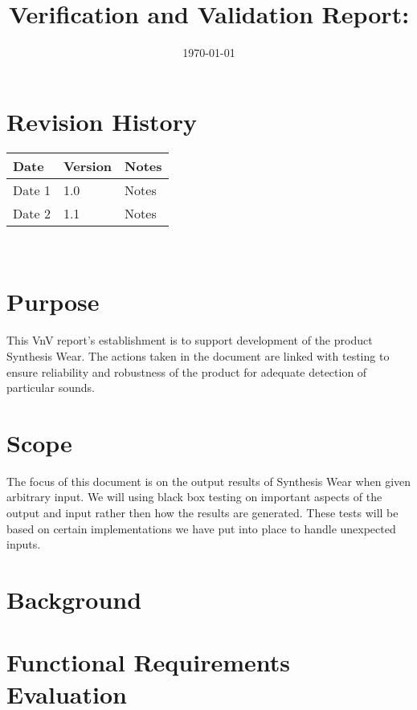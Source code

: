 \documentclass[12pt, titlepage]{article}
\begin{document}
\title{Verification and Validation Report: \progname} 
\author{\authname}
\date{\today}
	
\maketitle


\section{Revision History}

\begin{tabularx}{\textwidth}{p{3cm}p{2cm}X}
\toprule {\bf Date} & {\bf Version} & {\bf Notes}\\
\midrule
Date 1 & 1.0 & Notes\\
Date 2 & 1.1 & Notes\\
\bottomrule
\end{tabularx}

~\newpage

\section{Purpose}

This VnV report's establishment is to support development of the product Synthesis Wear. The actions taken in the document are linked with testing to ensure reliability and robustness of the product for adequate detection of particular sounds.

\section{Scope}

The focus of this document is on the output results of Synthesis Wear when given arbitrary input. We will using black box testing on important aspects of the output and input rather then how the results are generated. These tests will be based on certain implementations we have put into place to handle unexpected inputs.

\section{Background} 



\section{Functional Requirements Evaluation}
\end{document}
